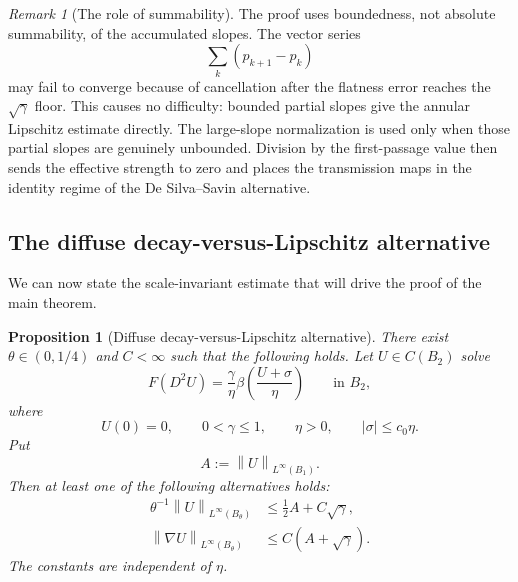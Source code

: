 \documentclass[11pt,letterpaper]{amsart}
\numberwithin{equation}{section}
\newcommand{\norm}[1]{\left\lVert #1\right\rVert}
\newtheorem{proposition}[theorem]{Proposition}
\theoremstyle{definition}
\theoremstyle{remark}
\newtheorem{remark}[theorem]{Remark}
\begin{document}
\begin{remark}[The role of summability]
\label{rem:slope-summability}
The proof uses boundedness, not absolute summability, of the accumulated
slopes. The vector series
$$
\sum_k(p_{k+1}-p_k)
$$
may fail to converge because of cancellation after the flatness error reaches
the $\sqrt\gamma$ floor. This causes no difficulty: bounded partial slopes
give the annular Lipschitz estimate directly. The large-slope normalization
is used only when those partial slopes are genuinely unbounded. Division by
the first-passage value then sends the effective strength to zero and places
the transmission maps in the identity regime of the De Silva--Savin
alternative.
\end{remark}

\subsection{The diffuse decay-versus-Lipschitz alternative}

We can now state the scale-invariant estimate that will drive the proof of
the main theorem.

\begin{proposition}[Diffuse decay-versus-Lipschitz alternative]
\label{prop:diffuse-DSS}
There exist $\theta\in(0,1/4)$ and $C<\infty$ such that the following
holds. Let $U\in C(B_2)$ solve
\begin{equation}\label{eq:diffuse-alternative-equation}
F(D^2U)
=
\frac\gamma\eta
\beta\left(\frac{U+\sigma}{\eta}\right)
\qquad\text{in }B_2,
\end{equation}
where
$$
U(0)=0,
\qquad
0<\gamma\leq1,
\qquad
\eta>0,
\qquad
|\sigma|\leq c_0\eta.
$$
Put
$$
A:=\norm{U}_{L^\infty(B_1)}.
$$
Then at least one of the following alternatives holds:
\begin{align}
\theta^{-1}\norm{U}_{L^\infty(B_\theta)}
&\leq
\frac12A+C\sqrt\gamma,
\label{eq:diffuse-decay}
\\
\norm{\nabla U}_{L^\infty(B_\theta)}
&\leq
C\left(A+\sqrt\gamma\right).
\label{eq:diffuse-lipschitz}
\end{align}
The constants are independent of $\eta$.
\end{proposition}
\end{document}
